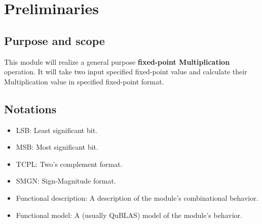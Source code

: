 \documentclass[a4paper, oneside]{report}
\author{Bolin Li and Yifang Dai}
\date{2025.3.28}
\begin{document}
    \setmainfont{TeX Gyre Heros}
    \maketitle
    \tableofcontents
    \thispagestyle{empty}
    \clearpage
    \pagestyle{fancy}
    \setcounter{page}{1}
    \chapter{Preliminaries}
        \section{Purpose and scope}
        This module will realize a general purpose \textbf{fixed-point Multiplication} operation. It will take two input specified fixed-point value and calculate their Multiplication value in specified fixed-point format.
        \section{Notations}
            \begin{itemize}
                \item LSB: Least significant bit.
                \item MSB: Most significant bit.
                \item TCPL: Two's complement format.
                \item SMGN: Sign-Magnitude format.
                \item Functional description: A description of the module's combinational behavior.
                \item Functional model: A (usually QuBLAS) model of the module's behavior.
            \end{itemize}
\end{document}

